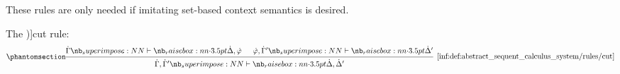 \begin{definition}
\begin{thmenum}
    These rules are only needed if imitating set-based context semantics is desired.

     The \term[ru=правило сечения (\cite[219]{КолмогоровДрагалин2006Логика})]{cut rule}:
    \begin{equation*}\taglabel[\logic{Cut}]{inf:def:abstract_sequent_calculus_system/rules/cut}
      \begin{prooftree}
        \hypo{ \syn\Gamma \synvdash \syn\Delta, \syn\varphi }
        \hypo{ \syn\varphi, \syn\Gamma' \synvdash \syn\Delta' }
        \infer2[\ref{inf:def:abstract_sequent_calculus_system/rules/cut}]{ \syn\Gamma, \syn\Gamma' \synvdash \syn\Delta, \syn\Delta' }
      \end{prooftree}
    \end{equation*}
  \end{thmenum}
\end{definition}

